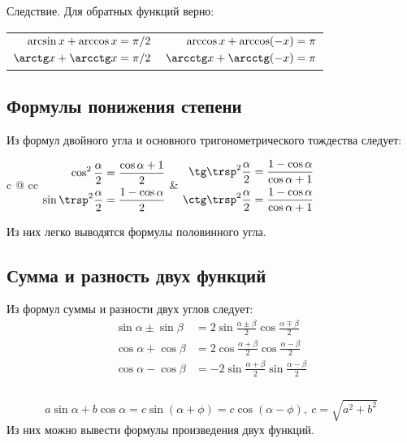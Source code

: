 {\bold Следствие.} Для обратных функций верно:

\begin{tabularx}{\textwidth}{C@{\quad\quad}C}
$\begin{aligned}
\arcsin x+\arccos x&=\pi/2\\
\arctg x+\arcctg x&=\pi/2
\end{aligned}$ &
$\begin{aligned}
\arccos x+\arccos(-x)&=\pi\\
\arcctg x+\arcctg(-x)&=\pi
\end{aligned}$
\end{tabularx}

\subsection{Формулы понижения степени}

Из формул двойного угла и основного тригонометрического тождества следует:\par
\begin{tabularc}{0pt}{0pt}{c @{\quad\quad} c}{c}
$\begin{aligned}
\cos^2\frac{\alpha}{2}&=\frac{\cos\alpha+1}{2}\\
\sin\trsp^2\frac{\alpha}{2}&=\frac{1-\cos\alpha}{2}
\end{aligned}$ &
$\begin{aligned}
\tg\trsp^2\frac{\alpha}{2}&=\frac{1-\cos\alpha}{\cos\alpha+1}\\
\ctg\trsp^2\frac{\alpha}{2}&=\frac{1-\cos\alpha}{\cos\alpha+1}
\end{aligned}$
\end{tabularc}

Из них легко выводятся формулы {\ital половинного угла}.

\subsection{Сумма и разность двух функций}

Из формул суммы и разности двух углов следует:
\begin{align*}
\sin\alpha\pm\sin\beta&=2\sin\frac{\alpha\pm\beta}{2}\cos\frac{\alpha\mp\beta}{2}\\[-2pt]
\cos\alpha+\cos\beta&=2\cos\frac{\alpha+\beta}{2}\cos\frac{\alpha-\beta}{2}\\[-2pt]
\cos\alpha-\cos\beta&=-2\sin\frac{\alpha+\beta}{2}\sin\frac{\alpha-\beta}{2}\\
\end{align*}\\[-34pt]
$$a\sin\alpha+b\cos\alpha=c\sin(\alpha+\phi)=c\cos(\alpha-\phi),\ c=\sqrt{a^2+b^2}$$
Из них можно вывести формулы {\ital произведения двух функций}.

